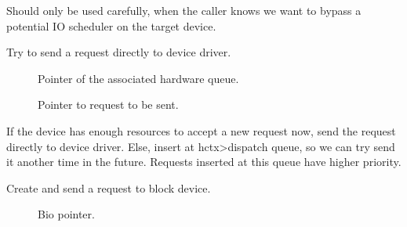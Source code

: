 \documentclass[a4paper,11pt,english]{sphinxmanual}
\begin{document}

Should only be used carefully, when the caller knows we want to
bypass a potential IO scheduler on the target device.

\begin{fulllineitems}
\label{\detokenize{blk-mq:c.blk_mq_try_issue_directly}}
Try to send a request directly to device driver.

\end{fulllineitems}


\begin{description}
\item[{}] \leavevmode
Pointer of the associated hardware queue.

\item[{}] \leavevmode
Pointer to request to be sent.

\end{description}


If the device has enough resources to accept a new request now, send the
request directly to device driver. Else, insert at hctx\sphinxhyphen{}\textgreater{}dispatch queue, so
we can try send it another time in the future. Requests inserted at this
queue have higher priority.

\begin{fulllineitems}
\label{\detokenize{blk-mq:c.blk_mq_submit_bio}}
Create and send a request to block device.

\end{fulllineitems}


\begin{description}
\item[{}] \leavevmode
Bio pointer.

\end{description}
\end{document}
